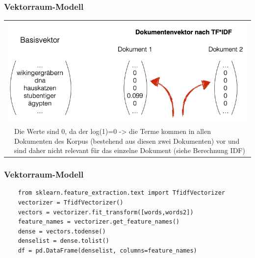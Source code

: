     
\begin{frame}
    \frametitle{Vektorraum-Modell}
    \vspace{.5cm}
    
    \begin{table}[htp]
    \begin{center}
    \begin{tabular}{p{3cm}p{7cm}}
    \multicolumn{2}{c}{\includegraphics[width=\linewidth]{fig8/tfidfvektor}}\\
     & \tiny{Die Werte sind 0, da der log(1)=0 -> die Terme kommen in allen Dokumenten des Korpus (bestehend aus diesen zwei Dokumenten) vor und sind daher nicht relevant für das einzelne Dokument (siehe Berechnung IDF)}\\
    \end{tabular}
    \end{center}
    \end{table}
    
\end{frame}
    
    
\begin{frame}[fragile]
\frametitle{Vektorraum-Modell}
    
    \begin{verbatim}
    from sklearn.feature_extraction.text import TfidfVectorizer
    vectorizer = TfidfVectorizer()
    vectors = vectorizer.fit_transform([words,words2])
    feature_names = vectorizer.get_feature_names()
    dense = vectors.todense()
    denselist = dense.tolist()
    df = pd.DataFrame(denselist, columns=feature_names)
    \end{verbatim}
\end{frame}
     
    
